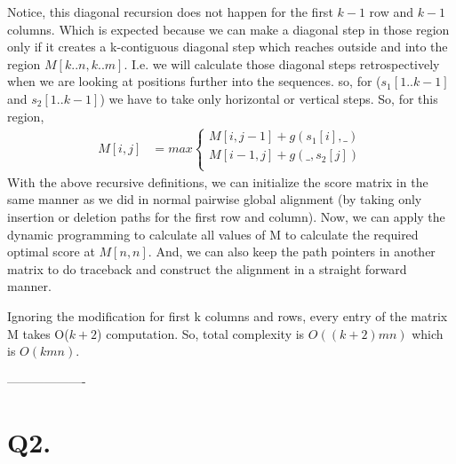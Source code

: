 \documentclass[a4paper,11pt]{article}
\begin{document}
Notice, this diagonal recursion does not happen for the first  $k-1$ row and $k-1$ columns. Which is expected because we can make a diagonal step in those region only if it creates a k-contiguous diagonal step which reaches outside and into the region $M[k..n,k..m]$. I.e. we will calculate those diagonal steps retrospectively when we are looking at positions further into the sequences.
so, for ($s_1[1..k-1]$ and $s_2[1..k-1]$) we have to take only horizontal or vertical steps. So, for this region,
\begin{align*}
 M[i,j] &= max\begin{cases}
               M[i,j-1] + g(s_1[i],\_)\\
               M[i-1,j] + g(\_,s_2[j])\\
              \end{cases}
\end{align*}
With the above recursive definitions, we can initialize the score matrix in the same manner as we did in normal pairwise global alignment (by taking only insertion or deletion paths for the first row and column). Now, we can apply the dynamic programming to calculate all values of M to calculate the required optimal score at $M[n,n]$. And, we can also keep the path pointers in another matrix to do traceback and construct the alignment in a straight forward manner.

Ignoring the modification for first k columns and rows, every entry of the matrix M takes O($k+2$) computation. So, total complexity is $O((k+2)mn)$ which is $O(kmn)$.
\begin{center}
 -------------------
\end{center}

\section*{Q2.}
\end{document}
